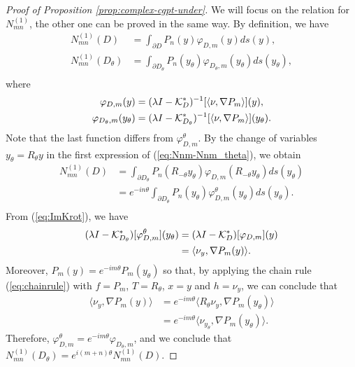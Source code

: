 \begin{proof}[Proof of Proposition \ref{prop:complex-cgpt-under}]
We will focus on the relation for $N_{mn}^{(1)}$, the other one can be
proved in the same way. By definition, we have
\begin{equation}
\begin{aligned}
N_{mn}^{(1)}(D) &= \int_{\partial D} P_n(y) \varphi_{D,m}(y) ds(y),\\
N_{mn}^{(1)}(D_\theta) &= \int_{\partial D_\theta} P_n(y_\theta) \varphi_{D_\theta,m}(y_\theta) ds(y_\theta),\\
\end{aligned}
\label{eq:Nnm-Nnm_theta}
\end{equation}
where
\begin{equation*}
\begin{aligned}
\varphi_{D,m}(y) &= (\lambda I - \mathcal{K}^*_{D})^{-1} [\langle \nu, \nabla P_m \rangle](y), \\
\varphi_{D_\theta,m}(y_\theta) &= (\lambda I -
\mathcal{K}^*_{D_\theta})^{-1}[\langle \nu, \nabla P_m \rangle ](y_\theta).
\end{aligned}
\end{equation*}
Note that the last function differs from $\varphi^{\theta}_{D,m}$.
By the change of variables $y_\theta=R_{\theta} y$ in the first
expression of  (\ref{eq:Nnm-Nnm_theta}), we obtain
\begin{equation*}
\begin{aligned}
N_{mn}^{(1)}(D) &= \int_{\partial D_\theta} P_n(R_{-\theta}y_\theta)
\varphi_{D,m}(R_{-\theta}y_\theta)
ds(y_\theta)\\
&= e^{-i n\theta}\int_{\partial D_\theta} P_n(y_\theta) \varphi^{\theta}_{D,m}(y_\theta) ds(y_\theta).\\
\end{aligned}
\end{equation*}
From (\ref{eq:ImKrot}), we have
\begin{equation*}
\begin{aligned}
(\lambda I - \mathcal{K}^*_{D_\theta})[\varphi^\theta_{D,m}](y_\theta) &= (\lambda I - \mathcal{K}^*_{D})[\varphi_{D,m}](y)\\
&= \langle \nu_y, \nabla P_m(y) \rangle.
\end{aligned}
\end{equation*}
Moreover, $P_m(y)=e^{-im\theta}P_m(y_\theta)$ so that, by applying
the chain rule (\ref{eq:chainrule}) with $f=P_m$, $T=R_\theta$,
$x=y$ and $h=\nu_y$, we can conclude that
\begin{equation*}
\begin{aligned}
\langle \nu_y,\nabla P_m(y) \rangle &= e^{-im\theta}\langle R_\theta\nu_y, \nabla P_m(y_\theta) \rangle \\
&= e^{-im\theta}\langle \nu_{y_\theta}, \nabla P_m(y_\theta)
\rangle.
\end{aligned}
\end{equation*}
Therefore,
$\varphi^\theta_{D,m}=e^{-im\theta}\varphi_{D_\theta,m}$, and we
conclude that
$N_{mn}^{(1)}(D_\theta)=e^{i(m+n)\theta}N_{mn}^{(1)}(D)$.


\end{proof}
